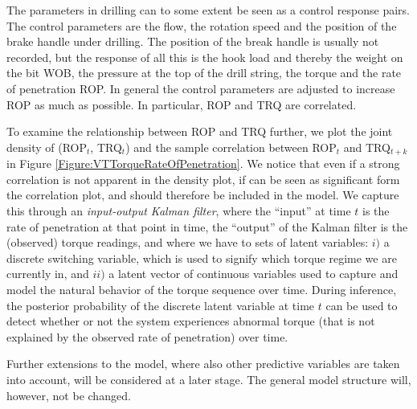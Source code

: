 The parameters in drilling can to some extent be seen as a control response pairs. The control parameters are the flow, the rotation speed and the position of the brake handle under drilling.  The position of the break handle is usually not recorded, but the response of all this is the hook load and thereby the weight on the bit WOB, the pressure at the top of the drill string, the torque and the rate of penetration ROP. In general the control parameters are adjusted to increase ROP as much as possible.  In particular, ROP and TRQ are correlated.

To examine the relationship between ROP and TRQ further, we plot the joint density of (ROP$_t$, TRQ$_t$) and the sample correlation between ROP$_t$ and TRQ$_{t+k}$ in Figure \ref{Figure:VTTorqueRateOfPenetration}. We notice that even if a strong correlation is not apparent in the density plot, if can be seen as significant form the correlation plot, and should therefore be included in the model. We capture this through an \textit{input-output Kalman filter}, where the ``input'' at time $t$ is the rate of penetration at that point in time, the ``output'' of the Kalman filter is the (observed) torque readings, and where we have to sets of latent variables: $i)$ a discrete switching variable, which is used to signify which torque regime we are currently in, and $ii)$ a latent vector of continuous variables used to capture and model the natural behavior of the torque sequence over time. During inference, the posterior probability of the discrete latent variable at time $t$ can be used to detect whether or not the system experiences abnormal torque (that is not explained by the observed rate of penetration) over time. 

Further extensions to the model, where also other predictive variables are taken into account, will be considered at a later stage. The general model structure will, however, not be changed.



